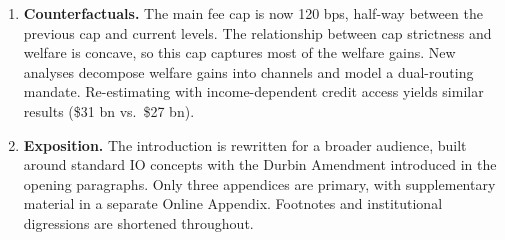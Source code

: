 \documentclass[main.tex]{subfiles}
\begin{document}
{\begin{enumerate}
        \item \textbf{Counterfactuals.} The main fee cap is now 120 bps, half-way between the previous cap and current levels. 
        The relationship between cap strictness and welfare is concave, so this cap captures most of the welfare gains.
        New analyses decompose welfare gains into channels and model a dual-routing mandate.
        Re-estimating with income-dependent credit access yields similar results (\$31 bn vs.\ \$27 bn).

        \item \textbf{Exposition.} The introduction is rewritten for a broader audience, built around standard IO concepts with the Durbin Amendment introduced in the opening paragraphs.
        Only three appendices are primary, with supplementary material in a separate Online Appendix. Footnotes and institutional digressions are shortened throughout.
    \end{enumerate}
}

\newcommand{\setrefereepage}[1]{%
  \clearpage
  \setcounter{page}{1}
  \renewcommand{\thepage}{R#1-\arabic{page}}
}

\newcommand{\refereeletter}{
Dear Referee,

Thank you for carefully reading the previous version of the paper and providing me with great comments and suggestions.
I think that the paper has improved substantially thanks to your suggested revisions.

This letter has two sections:

\begin{enumerate}
    \item The first section summarizes the key changes to the manuscript.
    \item The second section reports a detailed answer to each of the comments and suggestions in your letter. For each point, I first report your comment (in blue) and then discuss the paper modifications and extended analysis that address it.
\end{enumerate}

Sincerely,

Lulu Wang

\clearpage

\summarizechangeeditor{0}
\clearpage
}
\end{document}
